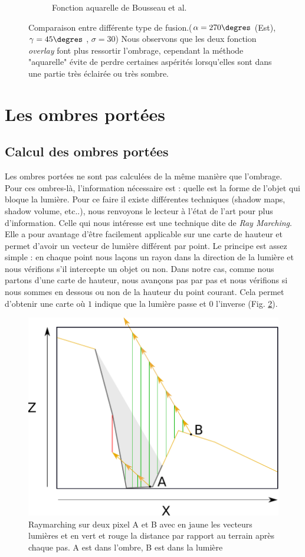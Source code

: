 \begin{figure}[!h]
\begin{subfigure}[t]{0.32\linewidth}
  \caption{Fonction aquarelle de Bousseau et al. \cite{bousseau2006interactive}}
 \end{subfigure}
 \caption{\label{fig:comparaisonFusion} Comparaison entre différente type de fusion.($\alpha =  270\degres$ (Est), $\gamma = 45\degres$ , $\sigma = 30$) Nous observons que les deux fonction \textit{overlay} font plus ressortir l'ombrage, cependant la méthode "aquarelle" évite de perdre certaines aspérités lorsqu'elles sont dans une partie très éclairée ou très sombre.}
\end{figure}


\section{Les ombres portées}
\subsection{Calcul des ombres portées}
Les ombres portées ne sont pas calculées de la même manière que l'ombrage. Pour ces ombres-là, l'information nécessaire est : quelle est la forme de l’objet qui bloque la lumière. Pour ce faire il existe différentes techniques (shadow maps, shadow volume, etc..), nous renvoyons le lecteur à l'état de l'art \cite{woo1990survey} pour plus d'information. Celle qui nous intéresse est une technique dite de \textit{Ray Marching}. Elle a pour avantage d'être facilement applicable sur une carte de hauteur et permet d'avoir un vecteur de lumière différent par point. 
Le principe est assez simple : en chaque point nous laçons un rayon dans la direction de la lumière et nous vérifions s'il intercepte un objet ou non. Dans notre cas, comme nous partons d'une carte de hauteur, nous avançons pas par pas et nous vérifions si nous sommes en dessous ou non de la hauteur du point courant. Cela permet d'obtenir une carte  où $1$ indique que la lumière passe et $0$ l'inverse (Fig. \ref{fig:raymarching}). 


\begin{figure}
\centering
\includegraphics[width=0.5\linewidth]{Solution/raymarching.pdf}
\caption{\label{fig:raymarching} Raymarching sur deux pixel A et B avec en jaune les vecteurs lumières et en vert et rouge la distance par rapport au terrain après chaque pas. A est dans l'ombre, B est dans la lumière}
\end{figure}
